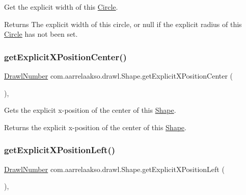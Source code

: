 Get the explicit width of this \hyperlink{classcom_1_1aarrelaakso_1_1drawl_1_1_circle}{Circle}. 

\begin{DoxyReturn}{Returns}
The explicit width of this circle, or {\ttfamily null} if the explicit radius of this \hyperlink{classcom_1_1aarrelaakso_1_1drawl_1_1_circle}{Circle} has not been set. 
\end{DoxyReturn}
\mbox{\label{classcom_1_1aarrelaakso_1_1drawl_1_1_shape_aaecae2f51794b77ff2f76b1be64b0d90}} 
\subsubsection{\texorpdfstring{get\+Explicit\+X\+Position\+Center()}{getExplicitXPositionCenter()}}
{\footnotesize\ttfamily \hyperlink{classcom_1_1aarrelaakso_1_1drawl_1_1_drawl_number}{Drawl\+Number} com.\+aarrelaakso.\+drawl.\+Shape.\+get\+Explicit\+X\+Position\+Center (\begin{DoxyParamCaption}{ }\end{DoxyParamCaption})\hspace{0.3cm}{\ttfamily [protected]}, {\ttfamily [inherited]}}



Gets the explicit x-\/position of the center of this \hyperlink{classcom_1_1aarrelaakso_1_1drawl_1_1_shape}{Shape}. 

\begin{DoxyReturn}{Returns}
the explicit x-\/position of the center of this \hyperlink{classcom_1_1aarrelaakso_1_1drawl_1_1_shape}{Shape}. 
\end{DoxyReturn}
\mbox{\label{classcom_1_1aarrelaakso_1_1drawl_1_1_shape_a339cf8811f57b7cb5251109b04be953c}} 
\subsubsection{\texorpdfstring{get\+Explicit\+X\+Position\+Left()}{getExplicitXPositionLeft()}}
{\footnotesize\ttfamily \hyperlink{classcom_1_1aarrelaakso_1_1drawl_1_1_drawl_number}{Drawl\+Number} com.\+aarrelaakso.\+drawl.\+Shape.\+get\+Explicit\+X\+Position\+Left (\begin{DoxyParamCaption}{ }\end{DoxyParamCaption})\hspace{0.3cm}{\ttfamily [protected]}, {\ttfamily [inherited]}}



